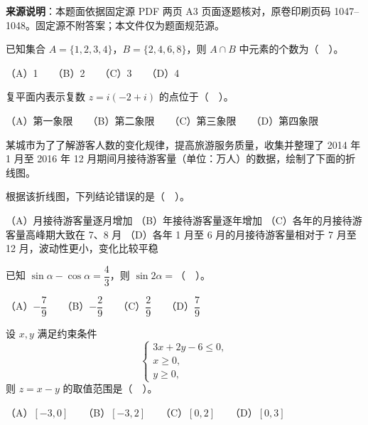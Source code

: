 


\begin{gktip}
\textbf{来源说明}：本题面依据固定源 PDF 两页 A3 页面逐题核对，原卷印刷页码 1047–1048。固定源不附答案；本文件仅为题面规范源。
\end{gktip}


\begin{question}
已知集合 \(A=\{1,2,3,4\}\)，\(B=\{2,4,6,8\}\)，则 \(A\cap B\) 中元素的个数为（　）。

（A）1　　（B）2　　（C）3　　（D）4

\end{question}
\begin{question}
复平面内表示复数 \(z=i(-2+i)\) 的点位于（　）。

（A）第一象限　　（B）第二象限　　（C）第三象限　　（D）第四象限

\Needspace{0.4\textheight}
\end{question}
\begin{question}
某城市为了了解游客人数的变化规律，提高旅游服务质量，收集并整理了 2014 年 1 月至 2016 年 12 月期间月接待游客量（单位：万人）的数据，绘制了下面的折线图。
\nopagebreak[4]
\begin{center}\end{center}
\nopagebreak[4]
根据该折线图，下列结论错误的是（　）。

（A）月接待游客量逐月增加
（B）年接待游客量逐年增加
（C）各年的月接待游客量高峰期大致在 7、8 月
（D）各年 1 月至 6 月的月接待游客量相对于 7 月至 12 月，波动性更小，变化比较平稳

\end{question}
\begin{question}
已知 \(\sin\alpha-\cos\alpha=\dfrac{4}{3}\)，则 \(\sin 2\alpha=\)（　）。

（A）\(-\dfrac{7}{9}\)　　（B）\(-\dfrac{2}{9}\)　　（C）\(\dfrac{2}{9}\)　　（D）\(\dfrac{7}{9}\)

\end{question}
\begin{question}
设 \(x,y\) 满足约束条件
\nopagebreak[4]
\[
\begin{cases}
3x+2y-6\leq 0,\\
x\geq 0,\\
y\geq 0,
\end{cases}
\]
则 \(z=x-y\) 的取值范围是（　）。

（A）\([-3,0]\)　　（B）\([-3,2]\)　　（C）\([0,2]\)　　（D）\([0,3]\)

\end{question}
